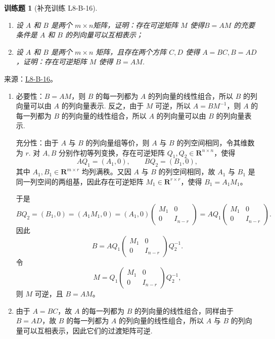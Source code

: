 \documentclass[UTF8,12pt,a4paper,fontset=fandol]{ctexart}
\newtheorem{exercise}{训练题}[section]
\begin{document}
\begin{exercise}[补充训练 L8-B-16]\label{prob:L8-B-16}
\begin{enumerate}
            \item 设 $A$ 和 $B$ 是两个 $m \times n$矩阵，证明：存在可逆矩阵 $M$ 使得$B = AM$ 的充要条件是 $A$ 和 $B$ 的列向量可以互相表示；
            \item 设 $A$ 和 $B$ 是两个 $m \times n$ 矩阵，且存在两个方阵 $C, D$ 使得 $A = BC, B = AD$，证明：存在可逆矩阵 $M$ 使得 $B = AM$.
        \end{enumerate}
\end{exercise}
\noindent 来源：\href{https://github.com/yhwu-is/Linear-Algebra-Left-Undone/blob/new/%E8%AE%B2%E4%B9%89/%E4%B8%93%E9%A2%98/8%20%E7%9B%B8%E6%8A%B5%E6%A0%87%E5%87%86%E5%BD%A2.tex}{L8-B-16}。
\begin{solve}
\begin{enumerate}
                \item 必要性：$B = AM$，则 $B$ 的每一列都为 $A$ 的列向量的线性组合，所以 $B$ 的列向量可以由 $A$ 的列向量表示. 反之，由于 $M$ 可逆，所以 $A = BM^{-1}$，则 $A$ 的每一列都为 $B$ 的列向量的线性组合，所以 $A$ 的列向量可以由 $B$ 的列向量表示.

                充分性：由于 $A$ 与 $B$ 的列向量组等价，则 $A$ 与 $B$ 的列空间相同，令其维数为 $r$. 对 $A, B$ 分别作初等列变换，存在可逆矩阵 $Q_1, Q_2 \in \mathbf{R}^{n\times n}$，使得
                \[ AQ_1 = (A_1, 0), \qquad BQ_2 = (B_1, 0), \]
                其中 $A_1, B_1 \in \mathbf{R}^{m\times r}$ 均列满秩。又因 $A$ 与 $B$ 的列空间相同，故 $A_1$ 与 $B_1$ 是同一列空间的两组基，因此存在可逆矩阵 $M_1 \in \mathbf{R}^{r\times r}$，使得 $B_1 = A_1M_1$。

                于是
                \[ BQ_2=(B_1,0) = (A_1M_1,0) = (A_1,0) \begin{pmatrix}
                    M_1 & 0 \\ 0 & I_{n-r}
                \end{pmatrix} = AQ_1 \begin{pmatrix}
                    M_1 & 0 \\ 0 & I_{n-r}
                \end{pmatrix}. \]
                因此
                \[ B = AQ_1 \begin{pmatrix}
                    M_1 & 0\\ 0 & I_{n-r}
                \end{pmatrix} Q_2^{-1}. \]
                令
                \[ M = Q_1 \begin{pmatrix}
                    M_1 & 0 \\ 0 & I_{n-r}
                    \end{pmatrix} Q_2^{-1}, \]
                则 $M$ 可逆，且 $B = AM$。

                \item 由于 $A = BC$，故 $A$ 的每一列都为 $B$ 的列向量的线性组合，同样由于$B = AD$，故 $B$ 的每一列都为 $A$ 的列向量的线性组合，所以 $A$ 与 $B$ 的列向量可以互相表示，因此它们的过渡矩阵可逆.
            \end{enumerate}
\end{solve}
\end{document}
